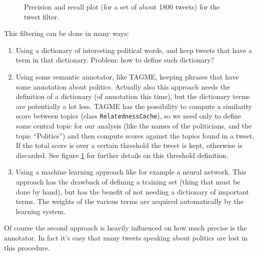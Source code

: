 \documentclass[a4paper,11pt,oneside]{article}
\begin{document}
\begin{figure}
\centering
{}
\caption{Precision and recall plot (for a set of about 1800 tweets) for the tweet filter.}
\label{fig:filterPrecision}
\end{figure}


This filtering can be done in many ways:
\begin{enumerate}
\item Using a dictionary of interesting political words, and keep tweets that have a term in that dictionary. Problem:  how to define such dictionary?
\item Using some semantic annotator, like TAGME, keeping phrases that have some annotation about politics. Actually also this approach needs the definition of a dictionary (of annotation this time), but the dictionary terms are potentially a lot less. TAGME has the possibility to compute a similarity score between topics (class \texttt{RelatednessCache}), so we need only to define some central topic for our analysis (like the names of the politicians, and the topic ``Politics'') and then compute scores against the topics found in a tweet. If the total score is over a certain threshold the tweet is kept, otherwise is discarded. See figure \ref{fig:filterPrecision} for further details on this threshold definition.
\item Using a machine learning approach like for example a neural network. This approach has the drawback of defining a training set (thing that must be done by hand), but has the benefit of not needing a dictionary of important terms. The weights of the various terms are acquired automatically by the learning system.
\end{enumerate}

Of course the second approach is heavily influenced on how much precise is the annotator. In fact it's easy that many tweets speaking about politics are lost in this procedure.
\end{document}
